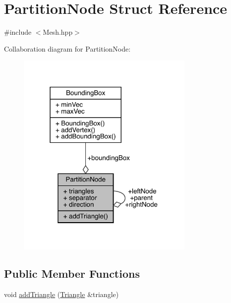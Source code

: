 \hypertarget{struct_partition_node}{}\section{Partition\+Node Struct Reference}
\label{struct_partition_node}


{\ttfamily \#include $<$Mesh.\+hpp$>$}



Collaboration diagram for Partition\+Node\+:\nopagebreak
\begin{figure}[H]
\begin{center}
\leavevmode
\includegraphics[width=243pt]{struct_partition_node__coll__graph}
\end{center}
\end{figure}
\subsection*{Public Member Functions}
\begin{DoxyCompactItemize}
\item 
void \hyperlink{struct_partition_node_aaababc44867907150c7371d071e7ec8d}{add\+Triangle} (\hyperlink{struct_triangle}{Triangle} \&triangle)
\end{DoxyCompactItemize}

